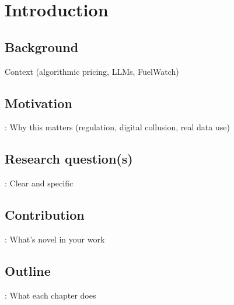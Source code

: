 \section{Introduction}
\subsection{Background}
Context (algorithmic pricing, LLMs, FuelWatch)

\subsection{Motivation}: Why this matters (regulation, digital collusion, real data use)

\subsection{Research question(s)}: Clear and specific

\subsection{Contribution}: What’s novel in your work

\subsection{Outline}: What each chapter does